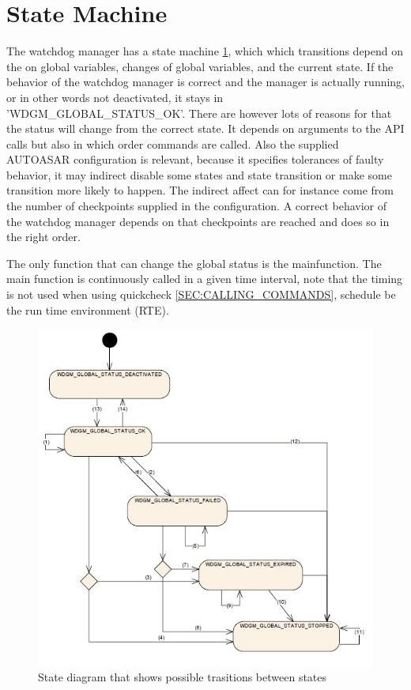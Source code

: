 
\section{State Machine}
The watchdog manager has a state machine \ref{FIG:GLOBALSTATUSES},
which which transitions depend on the on global variables, changes of global
variables, and the current state. If the behavior of the watchdog manager is
correct and the manager is actually running, or in other words not deactivated,
it stays in 'WDGM\_GLOBAL\_STATUS\_OK'. There are however lots of reasons for
that the status will change from the correct state. It depends on arguments to
the API calls but also in which order commands are called. Also the supplied
AUTOASAR configuration is relevant, because it specifies tolerances of faulty
behavior, it may indirect disable some states and state transition or make some
transition more likely to happen. The indirect affect can for instance come from
the number of checkpoints supplied in the configuration. A correct behavior of
the watchdog manager depends on that checkpoints are reached and does so in the
right order.

The only function that can change the global status is the mainfunction. The
main function is continuously called in a given time interval, note that the
timing is not used when using quickcheck \ref{SEC:CALLING_COMMANDS}, schedule be
the run time environment (RTE).

\begin{figure}[h!]
\label{FIG:GLOBALSTATUSES}
\caption{State diagram that shows possible trasitions between states}
\begin{center}
\includegraphics{pictures/globalstatuses.jpg}
\end{center}
\end{figure}



